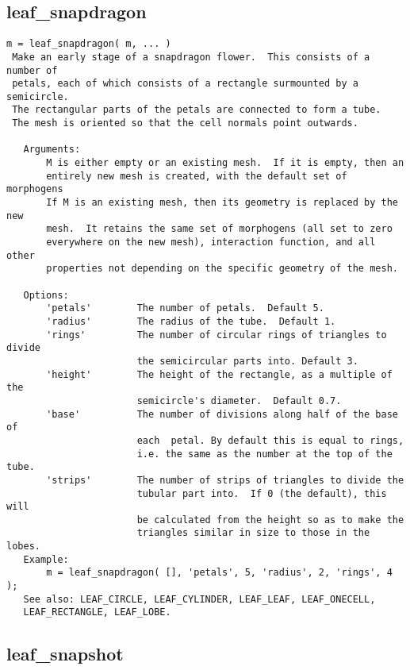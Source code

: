 \subsection{leaf\_snapdragon}\label{section-leaf-snapdragon}

\begin{verbatim}
m = leaf_snapdragon( m, ... )
 Make an early stage of a snapdragon flower.  This consists of a number of
 petals, each of which consists of a rectangle surmounted by a semicircle.
 The rectangular parts of the petals are connected to form a tube.
 The mesh is oriented so that the cell normals point outwards.

   Arguments:
       M is either empty or an existing mesh.  If it is empty, then an
       entirely new mesh is created, with the default set of morphogens
       If M is an existing mesh, then its geometry is replaced by the new
       mesh.  It retains the same set of morphogens (all set to zero
       everywhere on the new mesh), interaction function, and all other
       properties not depending on the specific geometry of the mesh.

   Options:
       'petals'        The number of petals.  Default 5.
       'radius'        The radius of the tube.  Default 1.
       'rings'         The number of circular rings of triangles to divide
                       the semicircular parts into. Default 3.
       'height'        The height of the rectangle, as a multiple of the
                       semicircle's diameter.  Default 0.7.
       'base'          The number of divisions along half of the base of
                       each  petal. By default this is equal to rings,
                       i.e. the same as the number at the top of the tube.
       'strips'        The number of strips of triangles to divide the
                       tubular part into.  If 0 (the default), this will
                       be calculated from the height so as to make the
                       triangles similar in size to those in the lobes.
   Example:
       m = leaf_snapdragon( [], 'petals', 5, 'radius', 2, 'rings', 4 );
   See also: LEAF_CIRCLE, LEAF_CYLINDER, LEAF_LEAF, LEAF_ONECELL,
   LEAF_RECTANGLE, LEAF_LOBE.
\end{verbatim}

\subsection{leaf\_snapshot}\label{section-leaf-snapshot}

